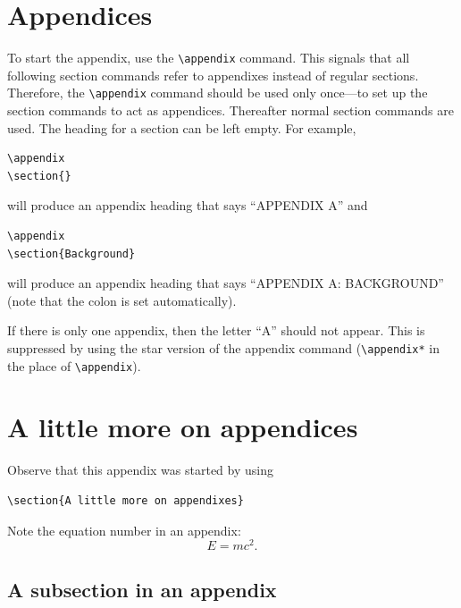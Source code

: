 \documentclass[preprint]{JASA}
\begin{document}
\section{Appendices}
To start the appendix, use the \verb+\appendix+ command.
This signals that all following section commands refer to appendixes
instead of regular sections. Therefore, the \verb+\appendix+ command
should be used only once---to set up the section commands to act as
appendices. Thereafter normal section commands are used. The heading
for a section can be left empty. For example,
\begin{verbatim}
\appendix
\section{}
\end{verbatim}
will produce an appendix heading that says ``APPENDIX A'' and
\begin{verbatim}
\appendix
\section{Background}
\end{verbatim}
will produce an appendix heading that says ``APPENDIX A: BACKGROUND''
(note that the colon is set automatically).

If there is only one appendix, then the letter ``A'' should not
appear. This is suppressed by using the star version of the appendix
command (\verb+\appendix*+ in the place of \verb+\appendix+).
\vskip12pt
\vskip1sp
\section{A little more on appendices}

Observe that this appendix was started by using
\begin{verbatim}
\section{A little more on appendixes}
\end{verbatim}

Note the equation number in an appendix:
\begin{equation}
E=mc^2.
\end{equation}


\subsection{\label{app:subsec}A subsection in an appendix}
\end{document}
